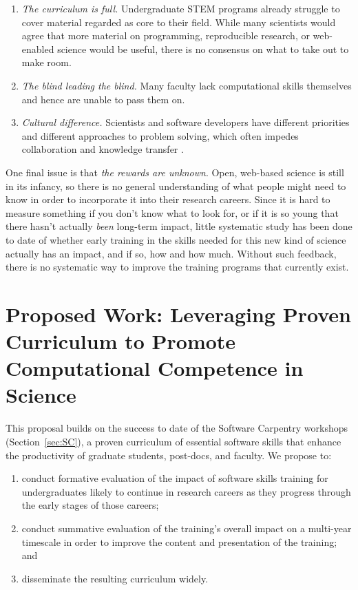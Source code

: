 \documentclass{proposalnsf}
\begin{document}
\begin{enumerate}

\item
  \emph{The curriculum is full.}  Undergraduate STEM programs already
  struggle to cover material regarded as core to their field.  While
  many scientists would agree that more material on programming,
  reproducible research, or web-enabled science would be useful, there
  is no consensus on what to take out to make room.

\item
  \emph{The blind leading the blind.}  Many faculty lack computational
  skills themselves and hence are unable to pass them on.

\item
  \emph{Cultural difference.}  Scientists and software developers have
  different priorities and different approaches to problem solving,
  which often impedes collaboration and knowledge transfer
  \cite{segal2005a}.

\end{enumerate}

One final issue is that \emph{the rewards are unknown}.  Open,
web-based science is still in its infancy, so there is no general
understanding of what people might need to know in order to
incorporate it into their research careers.  Since it is hard to
measure something if you don't know what to look for, or if it is so
young that there hasn't actually \emph{been} long-term impact, little
systematic study has been done to date of whether early training in
the skills needed for this new kind of science actually has an impact,
and if so, how and how much.  Without such feedback, there is no
systematic way to improve the training programs that currently exist.

\section{Proposed Work: Leveraging Proven Curriculum to Promote Computational Competence in Science}

This proposal builds on the success to date of the Software Carpentry
workshops (Section~\ref{sec:SC}), a proven curriculum of essential
software skills that enhance the productivity of graduate students,
post-docs, and faculty.  We propose to:

\begin{enumerate}

\item
  conduct formative evaluation of the impact of software skills
  training for undergraduates likely to continue in research careers
  as they progress through the early stages of those careers;

\item
  conduct summative evaluation of the training's overall impact on a
  multi-year timescale in order to improve the content and
  presentation of the training; and

\item
  disseminate the resulting curriculum widely.

\end{enumerate}
\end{document}
